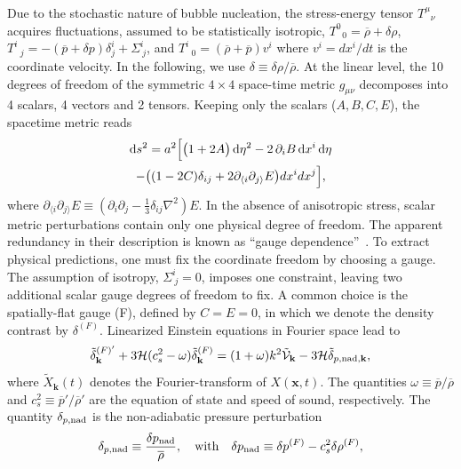 \documentclass[twocolumn,superscriptaddress,aps,preprintnumbers,amsmath,amssymb,prl,footinbib]{revtex4-2}
\begin{document}
Due to the stochastic nature of bubble nucleation, the stress-energy tensor $T^\mu_{\,\,\,\,\nu}$ acquires fluctuations, assumed to be statistically isotropic, $T^0_{\,\,\,\,0}=\overline{\rho}+\delta \rho$, $T^i_{\,\,\,\,j}=-(\overline{p}+\delta p)\delta^i_j+\Sigma^i_{~j}$, and $T^i_{\,\,\,\,0}=(\overline{\rho}+\overline{p})v^i$ where $v^i=dx^i/dt$ is the coordinate velocity. In the following, we use $\delta \equiv \delta \rho/\overline{\rho}$.
At the linear level, the 10 degrees of freedom of the symmetric $4\times4$ space-time metric $g_{\mu\nu}$ decomposes into 4 scalars, 4 vectors and 2 tensors. Keeping only the scalars ($A,B,C,E$), the spacetime metric reads
\begin{multline}
    \mathrm{d}s^2
    =
    a^2 \Bigl[
    \bigl(1 + 2A\bigr)\,\mathrm{d}\eta^2
    - 2\,\partial_i B\,\mathrm{d}x^i\,\mathrm{d}\eta  \\
-\big((1-2C)\delta_{ij}+2\partial_{\langle i}\partial_{j\rangle}E\big)dx^i dx^j\Bigr],
\end{multline}
where $\partial_{\langle i}\partial_{j\rangle} E \equiv (\partial_i\partial_j - \tfrac{1}{3}\delta_{ij}\nabla^2)E$. In the absence of anisotropic stress, scalar metric perturbations contain only one physical degree of freedom. The apparent redundancy in their description is known as ``gauge dependence''~\cite{Bardeen:1980kt}. To extract physical predictions, one must fix the coordinate freedom by choosing a gauge. The assumption of isotropy, $\Sigma^i_{~j} = 0$, imposes one constraint, leaving two additional scalar gauge degrees of freedom to fix.  A common choice is the spatially-flat gauge (F), defined by $C=E=0$, {in which we denote the density contrast by $\delta^{(F)}$.} Linearized Einstein equations in Fourier space lead to~\cite{SuppMat}
\color{black}
\begin{equation}
\label{eq:SF_continuity_prelude}
\tilde{\delta}^{(F)'}_\mathbf{k}+3\mathcal{H}(c_s^2-\omega)\tilde{\delta}^{(F)}_\mathbf{k}=(1+\omega) k^2\tilde{\mathcal{V}}_\mathbf{k}-3\mathcal{H}\tilde{\delta}_{p,\rm nad,\mathbf{k}},
\end{equation}
where $\tilde{X}_{\mathbf{k}}(t)$ denotes the Fourier-transform of $X(\mathbf{x},t)$.
The quantities $\omega \equiv \overline{p}/\overline{\rho}$ and $c_s^2\equiv {\overline{p}}'/{\overline{\rho}}'$ are the equation of state and speed of sound, respectively.
The quantity $\delta_{p,\rm nad}$ is the non-adiabatic pressure perturbation
\begin{align}
\delta_{p,\rm nad} \equiv \frac{\delta p_{\rm nad}}{\overline{\rho}},\quad \textrm{with}\quad \delta p_{\rm nad} \equiv \delta p^{(F)} - c_s^2 \delta \rho^{(F)},\label{eq:comoving_definition_deltapnad}
\end{align}
\end{document}
